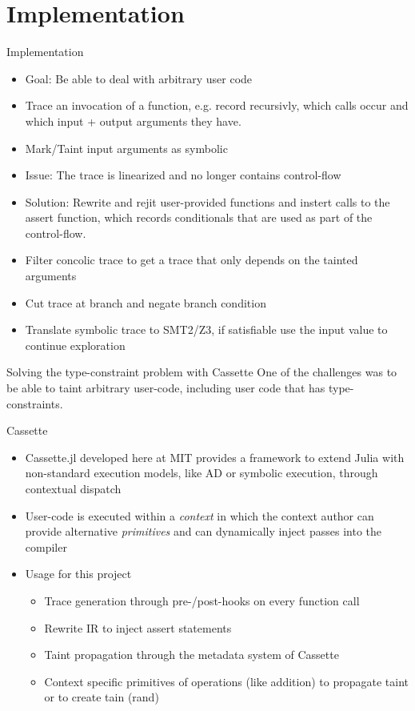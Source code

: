 \documentclass[aspectratio=169]{beamer}
\begin{document}
  \section{Implementation}
  \begin{frame}{Implementation}
      \begin{itemize}[<+->]
        \item Goal: Be able to deal with arbitrary user code
        \item Trace an invocation of a function, e.g. record recursivly,
              which calls occur and which input + output arguments they have.
        \item Mark/Taint input arguments as symbolic
        \item Issue: The trace is linearized and no longer contains control-flow
        \item Solution: Rewrite and rejit user-provided functions and instert calls
              to the assert function, which records conditionals that are used as part
              of the control-flow.
        \item Filter concolic trace to get a trace that only depends on the tainted arguments
        \item Cut trace at branch and negate branch condition
        \item Translate symbolic trace to SMT2/Z3, if satisfiable use the input value to continue exploration
    \end{itemize}
  \end{frame}
  \begin{frame}{Solving the type-constraint problem with Cassette}
      One of the challenges was to be able to taint arbitrary user-code, including user code that has type-constraints. \pause
      \begin{exampleblock}{Cassette}
          \begin{itemize}[<+->]
            \item Cassette.jl \cite{Revels_undated-st} developed here at MIT provides a framework to extend Julia with non-standard execution models, like AD or symbolic execution, through contextual dispatch
            \item User-code is executed within a \emph{context} in which the context author can provide alternative \emph{primitives} and can dynamically inject passes into the compiler
            \item Usage for this project
                \begin{itemize}[<+->]
                \item Trace generation through pre-/post-hooks on every function call
                \item Rewrite IR to inject assert statements
                \item Taint propagation through the metadata system of Cassette
                \item Context specific primitives of operations (like addition) to propagate taint or to create tain (rand)
            \end{itemize}
        \end{itemize}
      \end{exampleblock}
  \end{frame}
\end{document}
